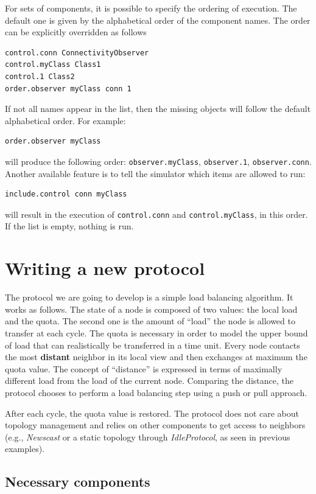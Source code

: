 \documentclass[a4paper,11pt]{article}
\begin{document}
For sets of components,
it is possible to specify the ordering of execution. The default one is given
by the alphabetical order of the component names.
The order can be explicitly overridden as follows
\begin{verbatim}
control.conn ConnectivityObserver
control.myClass Class1
control.1 Class2
order.observer myClass conn 1
\end{verbatim}
If not all names appear in the list,
then the missing objects will follow the default alphabetical order.
For example:
\begin{verbatim}
order.observer myClass
\end{verbatim}
will produce the following order:
\texttt{observer.myClass}, \texttt{observer.1},
\texttt{observer.conn}.
Another available feature is to tell the simulator which items are
allowed to run:
\begin{verbatim}
include.control conn myClass
\end{verbatim}
will result in the execution of \texttt{control.conn} and
\texttt{control.myClass}, in this order.
If the list is empty, nothing is run.

\section{Writing a new protocol}

The protocol we are going to develop is a simple load balancing algorithm.
It works as follows. The state of a node is composed of two values:
the local load and the quota. The second one is the amount of ``load''
the node is allowed to transfer at each cycle. The quota is necessary
in order to model the upper bound of load that can realistically be
transferred in a time unit.
Every node contacts the most \textbf{distant} neighbor
in its local view and then exchanges at maximum the quota value. The
concept of ``distance'' is expressed in terms of maximally
different load from the load of the current node. Comparing the distance,
the protocol chooses to perform a load balancing
step using a push or pull approach.

After each cycle, the quota value is restored.
The protocol does not care about topology management and relies on
other components to get access to neighbors (e.g., \emph{Newscast} or
a static topology through \emph{IdleProtocol}, as seen in previous
examples). 


\subsection{Necessary components}
\end{document}
